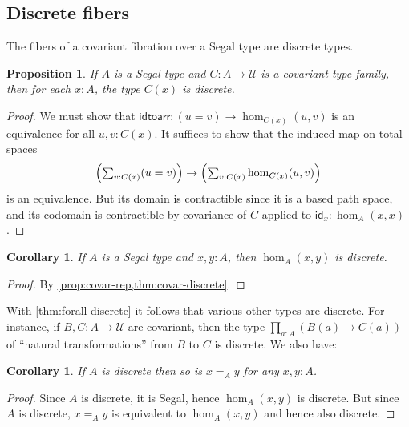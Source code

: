 \documentclass[12pt]{amsart}
\theoremstyle{plain}
\newtheorem{cor}[thm]{Corollary}
\newtheorem{prop}[thm]{Proposition}
\theoremstyle{definition}
\theoremstyle{remark}
\numberwithin{equation}{section}
\newcommand{\tsum}{\textstyle\sum}
\newcommand{\univtype}{\mathcal{U}}
\newcommand{\idtoarr}{\mathsf{idtoarr}}
\newcommand{\idarr}[1]{\mathsf{id}_{#1}}
\newcommand{\covtr}[1]{{#1}_*}  %
\newcommand{\istrans}[2]{\mathsf{trans}_{#1,#2}}
\newcommand{\Parens}[1]{\Bigl(#1\Bigr)}
\begin{document}



\subsection{Discrete fibers}

The fibers of a covariant fibration over a Segal type are discrete types.


\begin{prop}\label{thm:covar-discrete} If $A$ is a Segal type and $C \colon A \to \univtype$ is a covariant type family, then for each $x : A$, the type $C(x)$ is discrete.
\end{prop}
\begin{proof}
  We must show that $\idtoarr: (u=v) \to \hom_{C(x)}(u,v)$ is an equivalence for all $u,v:C(x)$.
  It suffices to show that the induced map on total spaces
  \[ \Parens{\tsum_{v:C(x)} (u=v)} \to \Parens{\sum_{v:C(x)} \hom_{C(x)}(u,v)} \]
  is an equivalence.
  But its domain is contractible since it is a based path space, and its codomain is contractible by covariance of $C$ applied to $\idarr x : \hom_A(x,x)$.
\end{proof}

\begin{cor}\label{thm:segal-hom-discrete}
  If $A$ is a Segal type and $x,y:A$, then $\hom_A(x,y)$ is discrete.
\end{cor}
\begin{proof}
  By \cref{prop:covar-rep,thm:covar-discrete}.
\end{proof}

With \cref{thm:forall-discrete} it follows that various other types are discrete.
For instance, if $B,C:A\to \univtype$ are covariant, then the type $\prod_{a:A} (B(a) \to C(a))$ of ``natural transformations'' from $B$ to $C$ is discrete.
We also have:

\begin{cor}\label{thm:discrete-eq-discrete}
  If $A$ is discrete then so is $x=_A y$ for any $x,y:A$.
\end{cor}
\begin{proof}
  Since $A$ is discrete, it is Segal, hence $\hom_A(x,y)$ is discrete.
  But since $A$ is discrete, $x=_A y$ is equivalent to $\hom_A(x,y)$ and hence also discrete.
\end{proof}
\end{document}
